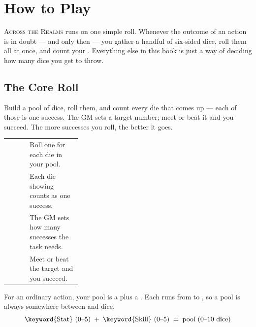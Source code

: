 \chapter{How to Play}
\begin{readaloud}
\lipsum[5][1-3]
\end{readaloud}

\lettrine{A}{cross the Realms} runs on one simple roll. Whenever the
outcome of an action is in doubt --- and only then --- you gather a handful
of six-sided dice, roll them all at once, and count your .
Everything else in this book is just a way of deciding how many dice you
get to throw.


\section{The Core Roll}
Build a pool of  dice, roll them, and count every die that comes
up  --- each of those is one success. The GM sets a
target number; meet or beat it and you succeed. The more successes you
roll, the better it goes.

\begin{statblock}
\begin{tabularx}{\linewidth}{@{}p{0.30\linewidth} Y@{}}
 & Roll one  for each die in your pool.\\[3pt]
 & Each die showing  counts as one success.\\[3pt]
 & The GM sets how many successes the task needs.\\[3pt]
 & Meet or beat the target and you succeed.\\
\end{tabularx}
\end{statblock}

For an ordinary action, your pool is a  plus a .
Each runs from  to , so a pool is always somewhere between
 and  dice.
\[
\text{\keyword{Stat} (0--5)} \;+\; \text{\keyword{Skill} (0--5)} \;=\; \text{pool (0--10 dice)}
\]

